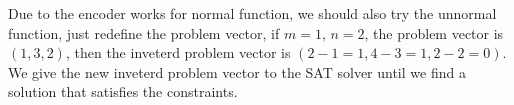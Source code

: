 \documentclass[conference,letterpaper]{IEEEtran}
\begin{document}
Due to the encoder works for normal function, we should also try the unnormal function, just redefine the problem vector, if $m = 1$, $n = 2$, the problem vector is $(1,3,2)$, then the inveterd problem vector is $(2-1=1, 4-3=1, 2-2=0)$. We give the new inveterd problem vector to the SAT solver until we find a solution that satisfies the constraints.



%
\end{document}
